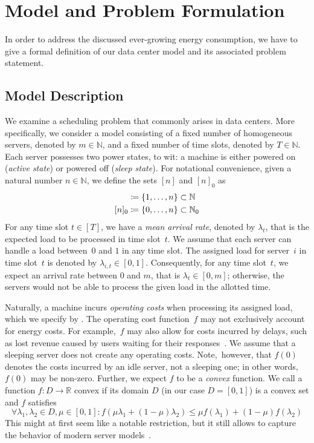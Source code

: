 
\chapter{Model and Problem Formulation}
In order to address the discussed ever-growing energy consumption, we have to give a formal definition of our data center model and its associated problem statement.

\section{Model Description}\label{sec:model_descr}
We examine a scheduling problem that commonly arises in data centers. More specifically, we consider a model consisting of a fixed number of homogeneous servers, denoted by $m\in\mathbb{N}$, and a fixed number of time slots, denoted by $T\in\mathbb{N}$. Each server possesses two power states, to wit: a machine is either powered on (\emph{active state}) or powered off (\emph{sleep state}). For notational convenience, given a natural number $n\in\mathbb{N}$, we define the sets $[n]$ and $[n]_0$ as
\begin{align*}
	[n]&\coloneqq\fromto{1}{n}\subset\mathbb{N}\\
	[n]_0&\coloneqq\fromto{0}{n}\subset\mathbb{N}_0
\end{align*}
For any time slot $t\in[T]$, we have a \emph{mean arrival rate}, denoted by $\lambda_t$, that is the expected load to be processed in time slot~$t$. We assume that each server can handle a load between~$0$ and $1$ in any time slot. The assigned load for server~$i$ in time slot~$t$ is denoted by $\lambda_{i,t}\in[0,1]$. Consequently, for any time slot~$t$, we expect an arrival rate between $0$ and $m$, that is $\lambda_t\in[0,m]$; otherwise, the servers would not be able to process the given load in the allotted time.

Naturally, a machine incurs \emph{operating costs} when processing its assigned load, which we specify by . The operating cost function~$f$ may not exclusively account for energy costs. For example,~$f$ may also allow for costs incurred by delays, such as lost revenue caused by users waiting for their responses~\parencite{dyn-right-sizing}\parencite{geo-load-balancing}. We assume that a sleeping server does not create any operating costs. Note,~however, that $f(0)$ denotes the costs incurred by an idle server, not a sleeping one; in other words, $f(0)$ may be non-zero. Further, we expect $f$ to be a \emph{convex} function. We call a function $f:D\rightarrow\mathbb{R}$ convex if its domain $D$ (in our case $D=[0,1]$) is a convex set and $f$ satisfies
\begin{equation}\label{eq:convex_condition}
	\forall \lambda_1,\lambda_2\in D,\mu\in[0,1]:f(\mu\lambda_1+(1-\mu)\lambda_2)\le\mu f(\lambda_1)+(1-\mu)f(\lambda_2)
\end{equation}
This might at first seem like a notable restriction, but it still allows to capture the behavior of modern server models~\parencite{bansal-soco}\parencite{dyn-right-sizing}.

